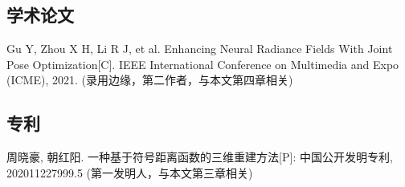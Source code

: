 
\begin{resume}

   \subsection*{学术论文}

   \begin{achievements}
   	\item Gu Y, Zhou X H, Li R J, et al. Enhancing Neural Radiance Fields With Joint Pose Optimization[C]. IEEE International Conference on Multimedia and Expo (ICME), 2021. (录用边缘，第二作者，与本文第四章相关)
   	
   \end{achievements}


  \subsection*{专利}

  \begin{achievements}
    \item 周晓豪, 朝红阳. 一种基于符号距离函数的三维重建方法[P]: 中国公开发明专利, 202011227999.5 (第一发明人，与本文第三章相关)
    
    
  \end{achievements}

\end{resume}
